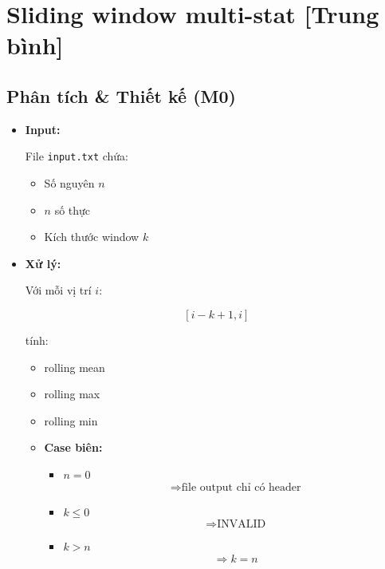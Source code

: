 \section{Sliding window multi-stat [Trung bình]}
\subsection{Phân tích \& Thiết kế (M0)}

\begin{itemize}

    \item \textbf{Input:}

    File \texttt{input.txt} chứa:

    \begin{itemize}
        \item Số nguyên \(n\)
        \item \(n\) số thực
        \item Kích thước window \(k\)
    \end{itemize}

    \item \textbf{Xử lý:}

    Với mỗi vị trí \(i\):

    \[
    [i-k+1, i]
    \]

    tính:

    \begin{itemize}
        \item rolling mean
        \item rolling max
        \item rolling min
    \end{itemize}

    \begin{itemize}

        \item \textbf{Case biên:}

        \begin{itemize}
            \item \(n = 0\)
            \[
                \Rightarrow \text{file output chỉ có header}
            \]

            \item \(k \le 0\)
            \[
                \Rightarrow \text{INVALID}
            \]

            \item \(k > n\)
            \[
                \Rightarrow k=n
            \]
        \end{itemize}


\end{itemize}
\end{itemize}
